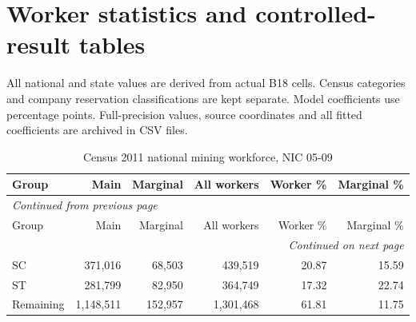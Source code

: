 \documentclass[11pt,a4paper]{report}
\begin{document}
\chapter{Worker statistics and controlled-result tables}
All national and state values are derived from actual B18 cells. Census categories and company reservation classifications are kept separate. Model coefficients use percentage points. Full-precision values, source coordinates and all fitted coefficients are archived in CSV files.
\begingroup\footnotesize\setlength{\tabcolsep}{4pt}
\begin{longtable}{lrrrrr}
\caption{Census 2011 national mining workforce, NIC 05-09}\\\toprule
Group & Main & Marginal & All workers & Worker \% & Marginal \% \\\midrule\endfirsthead
\multicolumn{6}{l}{\textit{Continued from previous page}}\\\toprule
Group & Main & Marginal & All workers & Worker \% & Marginal \% \\\midrule\endhead
\midrule\multicolumn{6}{r}{\textit{Continued on next page}}\\\endfoot\bottomrule\endlastfoot
SC & 371,016 & 68,503 & 439,519 & 20.87 & 15.59 \\
ST & 281,799 & 82,950 & 364,749 & 17.32 & 22.74 \\
Remaining & 1,148,511 & 152,957 & 1,301,468 & 61.81 & 11.75 \\
\end{longtable}\endgroup
\begingroup\footnotesize\setlength{\tabcolsep}{4pt}
\end{document}
